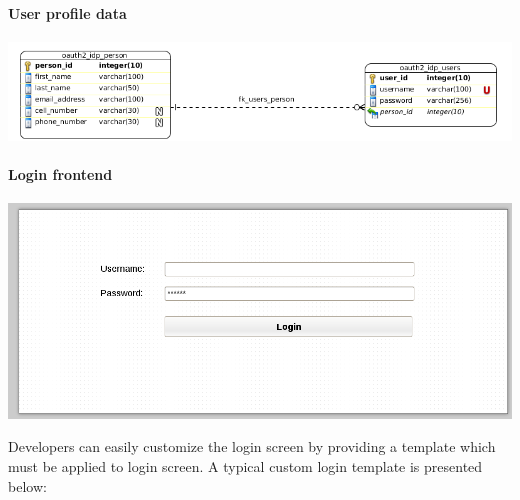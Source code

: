 \documentclass[letterpaper,10pt,english]{sphinxmanual}
\begin{document}
\paragraph{User profile data}
\label{features/oauth2/idp:user-profile-data}
\includegraphics{idp_profiles.png}


\paragraph{Login frontend}
\label{features/oauth2/idp:login-frontend}
\includegraphics{idp_login.png}

Developers can easily customize the login screen by providing a template which must be applied to login screen. A typical custom
login template is presented below:
\end{document}
